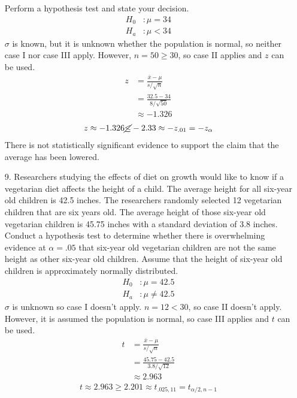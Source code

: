 \documentclass[letterpaper,12pt]{article}
\begin{document}
\begin{enumerate}
    Perform a hypothesis test and state your decision.
    \begin{align*}
      H_0&: \mu = 34 \\
      H_a&: \mu < 34
    \end{align*}
    $\sigma$ is known, but it is unknown whether the population is normal, so neither case I nor case III apply. However, $n = 50 \ge 30$, so case II applies and $z$ can be used.
    \begin{align*}
      z &= \frac{\bar{x} - \mu}{s / \sqrt{n}} \\
      &= \frac{32.5 - 34}{8 / \sqrt{50}} \\
      &\approx -1.326
    \end{align*}
    \begin{align*}
      z \approx -1.326 \cancel{\le} -2.33 \approx -z_{.01} = -z_{\alpha}
    \end{align*}
    There is not statistically significant evidence to support the claim that the average has been lowered.
  \item[9.]
    Researchers studying the effects of diet on growth would like to know if a vegetarian diet affects the height of a child. The average height for all six-year old children is 42.5 inches. The researchers randomly selected 12 vegetarian children that are six years old. The average height of those six-year old vegetarian children is 45.75 inches with a standard deviation of 3.8 inches. Conduct a hypothesis test to determine whether there is overwhelming evidence at $\alpha = .05$ that six-year old vegetarian children are not the same height as other six-year old children. Assume that the height of six-year old children is approximately normally distributed.
    \begin{align*}
      H_0&: \mu = 42.5 \\
      H_a&: \mu \ne 42.5
    \end{align*}
    $\sigma$ is unknown so case I doesn't apply. $n = 12 < 30$, so case II doesn't apply. However, it is assumed the population is normal, so case III applies and $t$ can be used.
    \begin{align*}
      t &= \frac{\bar{x} - \mu}{s / \sqrt{n}} \\
      &= \frac{45.75 - 42.5}{3.8 / \sqrt{12}} \\
      &\approx 2.963
    \end{align*}
    \begin{align*}
      t \approx 2.963 \ge 2.201 \approx t_{.025, 11} = t_{\alpha / 2, n - 1}

\end{align*}
\end{enumerate}
\end{document}
